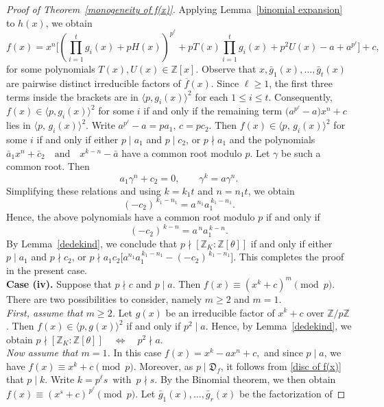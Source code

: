 \documentclass[10pt,a4paper]{amsart}
\newcommand{\D}{\mathfrak{D}}
\begin{document}
\begin{proof}[Proof of Theorem~\ref{monogeneity of f(x)}]
Applying Lemma~\ref{binomial expansion} to $h(x)$, we obtain
\[
f(x)=x^{n}\Biggl[
\left(\prod_{i=1}^{t} g_i(x)+pH(x)\right)^{p^{\ell}}
+pT(x)\prod_{i=1}^{t} g_i(x)
+p^{2}U(x)
-a+a^{p^{\ell}}
\Biggr]+c,
\]
for some polynomials $T(x),U(x)\in\mathbb{Z}[x]$. Observe that $x,\bar g_{1}(x),\ldots,\bar g_{t}(x)$ are pairwise distinct
irreducible factors of $\overline{f}(x)$.
Since $\ell\ge1$, the first three terms inside the brackets are in
$\langle p,g_i(x)\rangle^{2}$ for each $1\le i\le t$.
Consequently, $f(x)\in\langle p,g_i(x)\rangle^{2}$ for some $i$ if and only if the remaining term $\bigl(a^{p^{\ell}}-a\bigr)x^{n}+c$
lies in $\langle p,\, g_i(x)\rangle^{2}$. Write $a^{p^{\ell}}-a=pa_{1},
\, c=pc_{2}.$
Then $f(x)\in\langle p,\,g_i(x)\rangle^{2}$ for some $i$ if and only if
either $p\mid a_{1}$ and $p\mid c_{2}$, or $p\nmid a_{1}$ and the
polynomials $\bar a_{1}x^{n}+\bar c_{2}
\quad\text{and}\quad
x^{k-n}-\bar a$ have a common root modulo $p$. Let $\gamma$ be such a common root. Then
\[
a_{1}\gamma^{n}+c_{2}=0,
\qquad
\gamma^{k}=a\gamma^{n}.
\]
Simplifying these relations and using $k=k_{1}t$ and $n=n_{1}t$, we obtain
\[
(-c_{2})^{\,k_{1}-n_{1}}=a^{\,n_{1}}a_{1}^{\,k_{1}-n_{1}}.
\]
Hence, the above polynomials have a common root modulo $p$ if and only if
\[
(-c_{2})^{\,k-n}=a^{\,n}a_{1}^{\,k-n}.
\]
By Lemma~\ref{dedekind}, we conclude that
$p\nmid[\mathbb{Z}_{K}:\mathbb{Z}[\theta]]$ if and only if either
$p\mid a_{1}$ and $p\nmid c_{2}$, or
$
p\nmid a_{1}c_2
\bigl[a^{n_{1}}a_{1}^{\,k_{1}-n_{1}}-(-c_{2})^{\,k_{1}-n_{1}}\bigr].$
This completes the proof in the present case.\\[2mm]
\textbf{Case (iv).} Suppose that $p\nmid c$ and $p\mid a$. Then $f(x) \equiv (x^{k}+c)^{m} \pmod{p}.$ There are two possibilities to consider, namely $m\ge 2$ and $m=1$.\\
\emph{First, assume that $m\ge 2$.}
Let $g(x)$ be an irreducible factor of $x^{k}+c$ over $\mathbb{Z}/p\mathbb{Z}$.
Then $f(x)\in\langle p,g(x)\rangle^{2}$ if and only if $p^{2}\mid a$.
Hence, by Lemma~\ref{dedekind}, we obtain $p\nmid [\mathbb{Z}_{K}:\mathbb{Z}[\theta]]
\quad \Longleftrightarrow \quad
p^{2}\nmid a.$\\
\emph{Now assume that $m=1$.}
In this case $f(x)=x^{k}-ax^{n}+c,$ and since $p\mid a$, we have $f(x)\equiv x^{k}+c \pmod{p}.$ Moreover, as $p\mid \D_f$, it follows from \eqref{disc of f(x)} that $p\mid k$. Write $k=p^{\ell}s \, \text{ with }\, p\nmid s.$ By the Binomial theorem, we then obtain $f(x)\equiv (x^{s}+c)^{\,p^{\ell}} \pmod{p}.$ Let $\bar g_{1}(x),\ldots,\bar g_{r}(x)$ be the factorization of

\end{proof}
\end{document}
